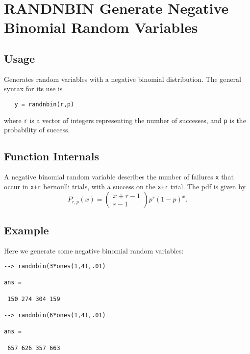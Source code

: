 \section{RANDNBIN Generate Negative Binomial Random Variables}

\subsection{Usage}

Generates random variables with a negative binomial distribution.
The general syntax for its use is
\begin{verbatim}
   y = randnbin(r,p)
\end{verbatim}
where \verb|r| is a vector of integers representing the number of
successes, and \verb|p| is the probability of success.
\subsection{Function Internals}

A negative binomial random variable describes the number of failures
\verb|x| that occur in \verb|x+r| bernoulli trials, with a success on the 
\verb|x+r| trial.  The pdf is given by
\[
  P_{r,p}(x)=\left(\begin{matrix} x+r-1 \\ r-1 \end{matrix}\right)p^r(1-p)^x.
\]
\subsection{Example}

Here we generate some negative binomial random variables:
\begin{verbatim}
--> randnbin(3*ones(1,4),.01)

ans = 

 150 274 304 159 

--> randnbin(6*ones(1,4),.01)

ans = 

 657 626 357 663 
\end{verbatim}

